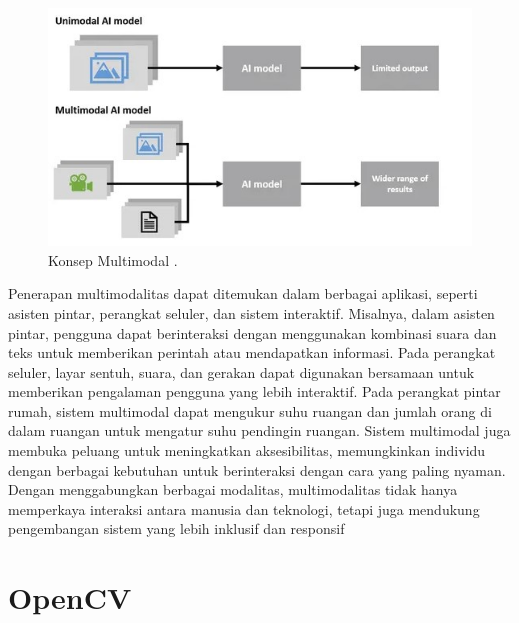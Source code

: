\begin{figure}[H]
  \centering

  \includegraphics[scale=0.8]{gambar/konsep_mul.jpg}

  \caption{Konsep Multimodal \parencite{dobotus}.}
\end{figure}


Penerapan multimodalitas dapat ditemukan dalam berbagai aplikasi, seperti asisten pintar, perangkat seluler, dan sistem interaktif. Misalnya, dalam asisten pintar, pengguna dapat berinteraksi dengan menggunakan kombinasi suara dan teks untuk memberikan perintah atau mendapatkan informasi. Pada perangkat seluler, layar sentuh, suara, dan gerakan dapat digunakan bersamaan untuk memberikan pengalaman pengguna yang lebih interaktif. Pada perangkat pintar rumah, sistem multimodal dapat mengukur suhu ruangan dan jumlah orang di dalam ruangan untuk mengatur suhu pendingin ruangan. Sistem multimodal juga membuka peluang untuk meningkatkan aksesibilitas, memungkinkan individu dengan berbagai kebutuhan untuk berinteraksi dengan cara yang paling nyaman. Dengan menggabungkan berbagai modalitas, multimodalitas tidak hanya memperkaya interaksi antara manusia dan teknologi, tetapi juga mendukung pengembangan sistem yang lebih inklusif dan responsif


\section{OpenCV}


